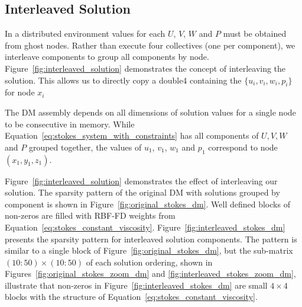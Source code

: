 \subsection{Interleaved Solution}

In a distributed environment values for each $U$, $V$, $W$ and $P$ must be obtained from ghost nodes. Rather than execute four collectives (one per component), we interleave components to group all components by node. Figure~\ref{fig:interleaved_solution} demonstrates the concept of interleaving the solution. This allows us to directly copy a double4 containing the $\{u_i, v_i, w_i, p_i\}$ for node $x_i$

The DM assembly depends on all dimensions of solution values for a single node to be consecutive in memory. While Equation~\ref{eq:stokes_system_with_constraints} has all components of $U, V, W$ and $P$ grouped together, the values of $u_1$, $v_1$, $w_1$ and $p_1$ correspond to node $(x_1, y_1, z_1)$. 

Figure~\ref{fig:interleaved_solution} demonstrates the effect of interleaving our solution. The sparsity pattern of the original DM with solutions grouped by component is shown in Figure~\ref{fig:original_stokes_dm}. Well defined blocks of non-zeros are filled with RBF-FD weights from Equation~\ref{eq:stokes_constant_viscosity}. Figure~\ref{fig:interleaved_stokes_dm} presents the sparsity pattern for interleaved solution components. The pattern is similar to a single block of Figure~\ref{fig:original_stokes_dm}, but the sub-matrix $(10:50)\times(10:50)$ of each solution ordering, shown in Figures~\ref{fig:original_stokes_zoom_dm} and \ref{fig:interleaved_stokes_zoom_dm}, illustrate that non-zeros in Figure~\ref{fig:interleaved_stokes_dm} are small $4\times4$ blocks with the structure of Equation~\ref{eq:stokes_constant_viscosity}.

